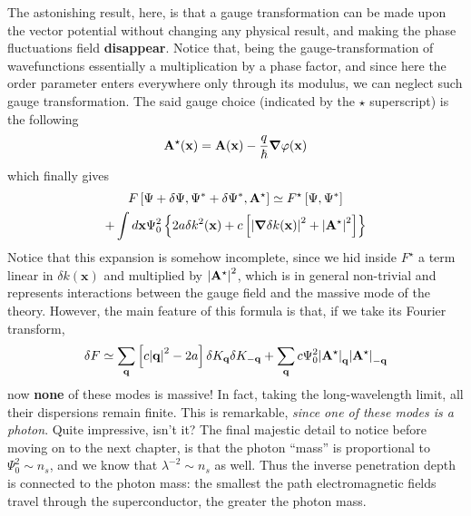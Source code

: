 The astonishing result, here, is that a gauge transformation can be made upon the vector potential without changing any physical result, and making the phase fluctuations field \textbf{disappear}. Notice that, being the gauge-transformation of wavefunctions essentially a multiplication by a phase factor, and since here the order parameter enters everywhere only through its modulus, we can neglect such gauge transformation. The said gauge choice (indicated by the $\star$ superscript) is the following
\[
    \mathbf{A}^\star (\mathbf{x}) = \mathbf{A} (\mathbf{x}) - \frac{q}{\hbar} \grad \varphi (\mathbf{x})
\]
which finally gives
\begin{multline*}
    F \left[{ \Psi + \delta\Psi,\Psi^* + \delta\Psi^*,\mathbf{A}^\star }\right] \simeq F^\star \left[{ \Psi,\Psi^*}\right] \\
    + \int d\mathbf{x} \Psi_0^2 \left\lbrace
        2a \delta k^2 (\mathbf{x}) + c \left[{
            \abs{\grad \delta k(\mathbf{x})}^2 + \abs{\mathbf{A}^\star}^2
        }\right]
    \right\rbrace
\end{multline*}
Notice that this expansion is somehow incomplete, since we hid inside $F^\star$ a term linear in $\delta k(\mathbf{x})$ and multiplied by $\abs{\mathbf{A}^\star}^2$, which is in general non-trivial and represents interactions between the gauge field and the massive mode of the theory. However, the main feature of this formula is that, if we take its Fourier transform,
\[
    \delta F \simeq \sum_\mathbf{q} \left[{ c \abs{\mathbf{q}}^2 - 2a }\right] \delta K_\mathbf{q} \delta K_{-\mathbf{q}} +  \sum_\mathbf{q} c\Psi_0^2 \abs{\mathbf{A}^\star}_\mathbf{q} \abs{\mathbf{A}^\star}_{-\mathbf{q}}
\]
now \textbf{none} of these modes is massive! In fact, taking the long-wavelength limit, all their dispersions remain finite. This is remarkable, \textit{since one of these modes is a photon}. Quite impressive, isn't it? The final majestic detail to notice before moving on to the next chapter, is that the photon ``mass'' is proportional to $\Psi_0^2 \sim n_s$, and we know that $\lambda^{-2} \sim n_s$ as well. Thus the inverse penetration depth is connected to the photon mass: the smallest the path electromagnetic fields travel through the superconductor, the greater the photon mass.